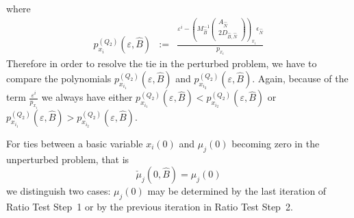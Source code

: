 \documentclass[a4paper]{article}
\newcommand{\px}[3]{\ensuremath{p_{x_{#1}}^{(#2)}(\varepsilon, #3)}}
\begin{document}
where
\begin{eqnarray}
\label{def:p_x_i_Q_2}
p_{x_{i}}^{(Q_{2})}(\varepsilon, \hat{B}) &:=&
  \frac{\varepsilon^{i} -
         \left(M_{\hat{B}}^{-1}
           \left(\begin{array}{c}
                    A_{\hat{N}}  \\
	            \hline
	            2D_{\hat{B}, \hat{N}}
	         \end{array}
	   \right)
         \right)_{x_{i}}\epsilon_{\hat{N}}}{p_{x_{i}}}
\end{eqnarray}
Therefore in order to resolve the tie in the perturbed problem, we have to
compare the polynomials \px{i_{1}}{Q_{2}}{\hat{B}} and
\px{i_{2}}{Q_{2}}{\hat{B}}. Again, because of the term
$\frac{\varepsilon^{i}}{p_{x_{i}}}$ we always have either
$\px{i_{1}}{Q_{2}}{\hat{B}} < \px{i_{2}}{Q_{2}}{\hat{B}}$ or
$\px{i_{1}}{Q_{2}}{\hat{B}} > \px{i_{2}}{Q_{2}}{\hat{B}}$.

For ties between a basic variable $x_{i}(0)$ and $\mu_{j}(0)$ becoming zero
in the unperturbed problem, that is
\begin{equation}
\label{eq:tie_unpert_ratio_test_step_2}
  \check{\mu}_{j}(0, \hat{B}) = \mu_{j}\left(0\right)
\end{equation}
we distinguish two cases: $\mu_{j}(0)$ may be
determined by the last iteration of Ratio Test Step~1 or by the previous
iteration in Ratio Test Step~2.
\end{document}
